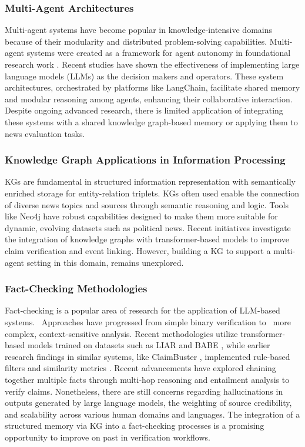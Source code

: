 \documentclass[11pt]{article}
\begin{document}
\subsubsection{Multi-Agent Architectures}
Multi-agent systems have become popular in knowledge-intensive domains because of their modularity and distributed problem-solving capabilities. Multi-agent systems were created as a framework for agent autonomy in foundational research work \cite{r20}. Recent studies have shown the effectiveness of implementing large language models (LLMs) as the decision makers and operators\cite{r21}\cite{r22}. These system architectures, orchestrated by platforms like LangChain\cite{r23}, facilitate shared memory and modular reasoning among agents, enhancing their collaborative interaction. Despite ongoing advanced research, there is limited application of integrating these systems with a shared knowledge graph-based memory or applying them to news evaluation tasks.

\subsubsection{Knowledge Graph Applications in Information Processing}
KGs are fundamental in structured information representation with semantically enriched storage for entity-relation triplets. KGs often used enable the connection of diverse news topics and sources through semantic reasoning and logic. Tools like Neo4j have robust capabilities designed to make them more suitable for dynamic, evolving datasets such as political news. Recent initiatives \cite{r24}\cite{r25}investigate the integration of knowledge graphs with transformer-based models to improve claim verification and event linking. However, building a KG to support a multi-agent setting in this domain, remains unexplored.

\subsubsection{Fact-Checking Methodologies}
Fact-checking is a popular area of research for the application of LLM-based systems.  Approaches have progressed from simple binary verification to  more complex, context-sensitive analysis. Recent methodologies utilize transformer-based models trained on datasets such as LIAR\cite{r26} and BABE \cite{r27}, while earlier research findings in similar systems, like ClaimBuster \cite{r28}, implemented rule-based filters and similarity metrics \cite{r29}. Recent advancements have explored chaining together multiple facts through multi-hop reasoning and entailment analysis to verify claims\cite{r30}. Nonetheless, there are still concerns regarding hallucinations in outputs generated by large language models, the weighting of source credibility, and scalability across various human domains and languages. The integration of a structured memory via KG into a fact-checking processes is a promising opportunity to improve on past in verification workflows.
\end{document}
